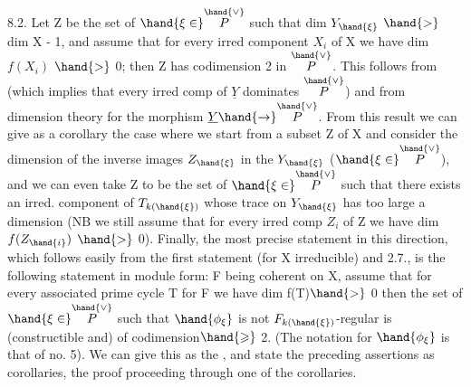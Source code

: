 
8.2. Let Z be the set of $\hand{\xi\in}\overset{\hand{\vee}}{P}$ such that dim $Y_{\hand{\xi}}$ $\hand{>}$ dim X - 1,\hand{\unsure{\xi}}
and assume that for every irred component $X_i$ of X we have dim $f(X_i)$ $\hand{>}$ 0;
then Z has codimension 2 in $\overset{\hand{\vee}}{P}$.  This
follows from 
 (which implies that every irred comp of $\underline{Y}$ dominates $\overset{\hand{\vee}}{P}$) and from
dimension theory for the morphism $\underline{Y} \hand{\to} \overset{\hand{\vee}}{P}$. From this
result  we can give as a corollary the case where
we start from a   subset Z of X and consider the dimension of the
inverse images $Z_{\hand{\xi}}$ in the $Y_{\hand{\xi}}$ ($\hand{\xi\in}\overset{\hand{\vee}}{P}$), and we can even take
Z to be the set of $\hand{\xi\in}\overset{\hand{\vee}}{P}$ such that there exists an irred. component of $T_{k(\hand{\xi})}$
whose trace on $Y_{\hand{\xi}}$ has too large a dimension (NB we still assume
that for every irred comp $Z_i$ of Z we have dim $f(Z_{\hand{i}})$ $\hand{>}$ 0). Finally, the
most precise statement in this direction, which follows easily from the first
statement (for X irreducible) and 2.7., is the following statement in module form:
F being coherent on X,  assume that for every associated prime cycle
T for F we have dim f(T)$\hand{>}$ 0\unsure{;|,} then the set of $\hand{\xi\in}\overset{\hand{\vee}}{P}$ such that
$\hand{\phi_\xi}$ is not $F_{k(\hand{\xi})}$-regular is (constructible and) of codimension$\hand{\geqslant}$ 2.
 (The notation for $\hand{\phi_\xi}$ is that of no. 5). We can give this as the
 , and state the  preceding assertions
 as corollaries, the proof proceeding through one of the corollaries.

